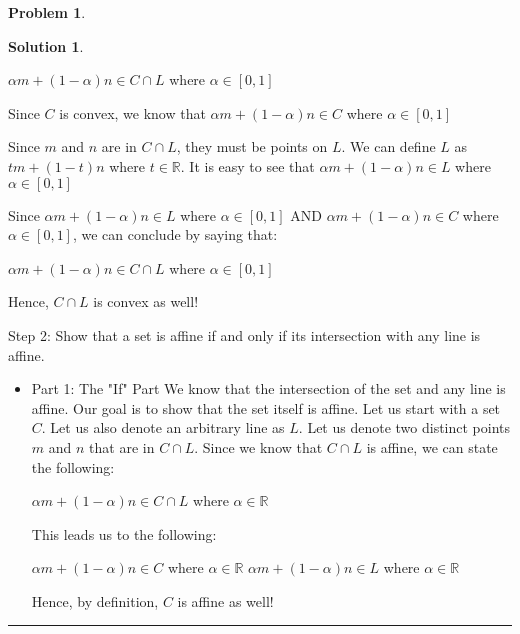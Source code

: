 \documentclass{article}
\theoremstyle{definition}
\newtheorem{problem}{Problem}
\def\fline{\rule{0.75\linewidth}{0.5pt}}
\newcommand{\finishline}{\begin{center}\fline\end{center}}
\newtheorem*{solution*}{Solution}
\newenvironment{solution}{\begin{solution*}}{{\finishline} \end{solution*}}
\begin{document}
\begin{problem}
\begin{solution}
\begin{itemize}
        $\alpha m + (1 - \alpha)n \in C \cap L$ where $\alpha \in [0, 1]$ \newline 
        
        Since $C$ is convex, we know that 
        $\alpha m + (1 - \alpha)n \in C$ where $\alpha \in [0, 1]$ \newline


        Since $m$ and $n$ are in $C \cap L$, they must be points on $L$. We can define $L$ as $tm + (1 - t)n$ where $t \in \mathbb{R}$. It is easy to see that $\alpha m + (1 - \alpha)n \in L$ where $\alpha \in [0, 1]$ \newline 

        Since $\alpha m + (1 - \alpha)n \in L$ where $\alpha \in [0, 1]$ AND $\alpha m + (1 - \alpha)n \in C$ where $\alpha \in [0, 1]$, we can conclude by saying that: 

        $\alpha m + (1 - \alpha)n \in C \cap L$ where $\alpha \in [0, 1]$ \newline 

        Hence, $C \cap L$ is convex as well! 
        \end{itemize}

        
        Step 2: Show that a set is affine if and only if its intersection with any line is affine. 
        \begin{itemize}
            \item Part 1: The "If" Part \newline
        We know that the intersection of the set and any line is affine. Our goal is to show that the set itself is affine. Let us start with a set $C$. Let us also denote an arbitrary line as $L$. Let us denote two distinct points $m$ and $n$ that are in $C \cap L$. Since we know that $C \cap L$ is affine, we can state the following: \newline 

        $\alpha m + (1 - \alpha)n \in C \cap L$ where $\alpha \in \mathbb{R}$ \newline 

        This leads us to the following: \newline 

        $\alpha m + (1 - \alpha)n \in C$ where $\alpha \in \mathbb{R}$ \newline 
        $\alpha m + (1 - \alpha)n \in L$ where $\alpha \in \mathbb{R}$ \newline 
        
        Hence, by definition, $C$ is affine as well! 
        

\end{itemize}
\end{solution}
\end{problem}
\end{document}
